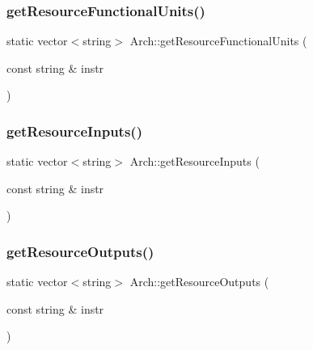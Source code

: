 \mbox{\label{classArch_a422c4ccd83e3652e7f11158272198397}} 
\subsubsection{\texorpdfstring{get\+Resource\+Functional\+Units()}{getResourceFunctionalUnits()}}
{\footnotesize\ttfamily static vector$<$string$>$ Arch\+::get\+Resource\+Functional\+Units (\begin{DoxyParamCaption}\item[{const string \&}]{instr }\end{DoxyParamCaption})\hspace{0.3cm}{\ttfamily [static]}}

\mbox{\label{classArch_ac228ffb5a673b5250d0517a5bf6813b4}} 
\subsubsection{\texorpdfstring{get\+Resource\+Inputs()}{getResourceInputs()}}
{\footnotesize\ttfamily static vector$<$string$>$ Arch\+::get\+Resource\+Inputs (\begin{DoxyParamCaption}\item[{const string \&}]{instr }\end{DoxyParamCaption})\hspace{0.3cm}{\ttfamily [static]}}

\mbox{\label{classArch_a368512825e8cdad354097faf60101ec1}} 
\subsubsection{\texorpdfstring{get\+Resource\+Outputs()}{getResourceOutputs()}}
{\footnotesize\ttfamily static vector$<$string$>$ Arch\+::get\+Resource\+Outputs (\begin{DoxyParamCaption}\item[{const string \&}]{instr }\end{DoxyParamCaption})\hspace{0.3cm}{\ttfamily [static]}}

